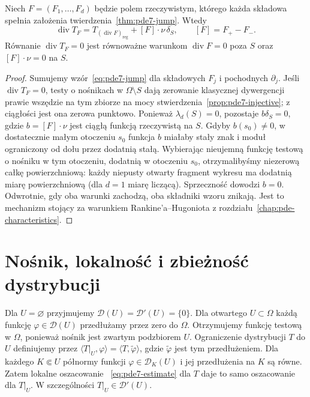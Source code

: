 \begin{wniosek}
Niech $F=(F_1,\ldots,F_d)$ będzie polem rzeczywistym,
którego każda składowa spełnia założenia
twierdzenia~\ref{thm:pde7-jump}. Wtedy
\[
 \operatorname{div}T_F
 =T_{(\operatorname{div}F)_{\mathrm{reg}}}
 +[F]\cdot\nu\,\delta_S,\qquad [F]=F_+-F_-.
\]
Równanie $\operatorname{div}T_F=0$ jest równoważne
warunkom $\operatorname{div}F=0$ poza $S$ oraz
$[F]\cdot\nu=0$ na $S$.
\end{wniosek}
\begin{proof}
Sumujemy wzór~\eqref{eq:pde7-jump} dla składowych
$F_j$ i pochodnych $\partial_j$.
Jeśli $\operatorname{div}T_F=0$, testy o nośnikach
w $\Omega\setminus S$ dają zerowanie klasycznej
dywergencji prawie wszędzie na tym zbiorze na mocy
stwierdzenia~\ref{prop:pde7-injective}; z ciągłości
jest ona zerowa punktowo. Ponieważ $\lambda_d(S)=0$,
pozostaje $b\delta_S=0$, gdzie $b=[F]\cdot\nu$ jest
ciągłą funkcją rzeczywistą na $S$.
Gdyby $b(s_0)\ne0$, w dostatecznie małym otoczeniu
$s_0$ funkcja $b$ miałaby stały znak i moduł
ograniczony od dołu przez dodatnią stałą.
Wybierając nieujemną funkcję testową o nośniku
w tym otoczeniu, dodatnią w otoczeniu $s_0$,
otrzymalibyśmy niezerową całkę powierzchniową:
każdy niepusty otwarty fragment wykresu ma dodatnią
miarę powierzchniową (dla $d=1$ miarę liczącą).
Sprzeczność dowodzi $b=0$. Odwrotnie, gdy oba
warunki zachodzą, oba składniki wzoru znikają.
Jest to mechanizm stojący za warunkiem
Rankine'a--Hugoniota z rozdziału~\ref{chap:pde-characteristics}.
\end{proof}

\section{Nośnik, lokalność i zbieżność dystrybucji}
\label{sec:pde7-support}

Dla $U=\varnothing$ przyjmujemy
$\mathcal D(U)=\mathcal D'(U)=\{0\}$.
Dla otwartego $U\subset\Omega$ każdą funkcję
$\varphi\in\mathcal D(U)$ przedłużamy przez zero
do $\Omega$. Otrzymujemy funkcję testową w $\Omega$,
ponieważ nośnik jest zwartym podzbiorem $U$.
Ograniczenie dystrybucji $T$ do $U$ definiujemy przez
$\langle T|_U,\varphi\rangle=\langle T,\widetilde\varphi\rangle$,
gdzie $\widetilde\varphi$ jest tym przedłużeniem.
Dla każdego $K\Subset U$ półnormy funkcji
$\varphi\in\mathcal D_K(U)$ i jej przedłużenia na $K$
są równe. Zatem lokalne oszacowanie
~\eqref{eq:pde7-estimate} dla $T$ daje to samo
oszacowanie dla $T|_U$. W szczególności
$T|_U\in\mathcal D'(U)$.

